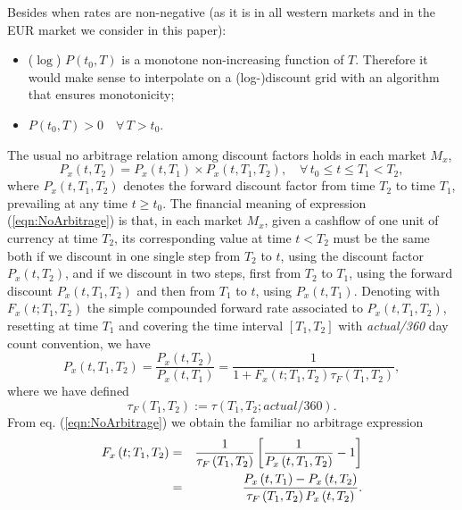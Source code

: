 \documentclass[11pt,reqno]{amsart}
\begin{document}
Besides when rates are non-negative (as it is in all western markets and in the EUR market we consider in this paper):
\begin{itemize}
\item ($\log $) $P(t_0,T)$ is a monotone non-increasing function of $T$. Therefore it would make sense to interpolate on a (log-)discount grid with an algorithm that ensures monotonicity;
\item $P\left(t_0,T\right)>0\quad\forall\,T>t_0$.
\end{itemize}
\par
The usual no arbitrage relation among discount factors holds in each market $M_{x}$,
\begin{equation}
P_{x}\left(t,T_{2}\right)
= P_{x}\left(t,T_{1}\right) \times P_{x}\left(t,T_{1},T_{2}\right),
\quad\forall\, t_0 \leq t \leq T_{1}<T_{2},
\label{eqn:NoArbitrage}
\end{equation}
where $P_{x}\left(t,T_{1},T_{2}\right) $ denotes the forward discount factor from time $T_{2}$ to time $T_{1}$, prevailing at any time $t\geq t_0$. The financial meaning of expression (\ref{eqn:NoArbitrage}) is that, in each market $M_{x}$, given a cashflow of one unit of currency at time $T_{2}$, its corresponding value at time $t<T_{2}$ must be the same both if we discount in one single step from $T_{2}$ to $t$, using the discount factor $P_{x}\left(t,T_{2}\right)$, and if we discount in two steps, first from $T_{2}$ to $T_{1}$, using the forward discount $P_{x}\left(t,T_{1},T_{2}\right)$ and then from $T_{1}$ to $t$, using $P_{x}\left(t,T_{1}\right)$. Denoting with $F_{x}\left(t;T_{1},T_{2}\right)$ the simple compounded forward rate associated to $P_{x}\left(t,T_{1},T_{2}\right)$, resetting at time $T_{1}$ and covering the time interval $\left[T_{1},T_{2}\right]$ with \emph{actual/360} day count convention, we have
\begin{equation}
P_{x}\left(t,T_{1},T_{2}\right)
= \frac{P_{x}\left(t,T_{2}\right)}{P_{x}\left(t,T_{1}\right)}
= \frac{1}{1+F_{x}\left(t;T_{1},T_{2}\right)\tau_F\left(T_{1},T_{2}\right) },
\label{eqn:FwdRate}
\end{equation}
where we have defined
\begin{equation}
\tau_F\left(T_{1},T_{2}\right) := \tau\left(T_{1},T_{2};actual/360\right).
\label{eqn:yfFRA}
\end{equation}
From eq. (\ref{eqn:NoArbitrage}) we obtain the familiar no arbitrage expression
\begin{eqnarray}
F_{x}\left(t;T_{1},T_{2}\right)
&=& \frac{1}{\tau_F\left(T_{1},T_{2}\right)}\left[\frac{1}{P_{x}\left(t,T_{1},T_{2}\right) }-1\right]   \notag \\
&=& \frac{P_{x}\left(t,T_{1}\right) - P_{x}\left(t,T_{2}\right)}{\tau_F\left(T_{1},T_{2}\right) P_{x}\left(t,T_{2}\right)}.
\label{eqn:FwdRate}
\end{eqnarray}
\end{document}
